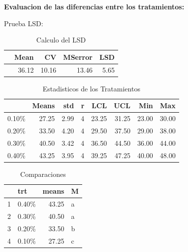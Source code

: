 \documentclass[12pt,letterpaper]{report}
\begin{document}
\textbf{Evaluacion de las diferencias entre los tratamientos:}

Prueba LSD:
\begin{Schunk}
\end{Schunk}

\begin{table}[ht]
\centering
\begin{tabular}{rrrrr}
  \hline
 & Mean & CV & MSerror & LSD \\ 
  \hline
  & 36.12 & 10.16 & 13.46 & 5.65 \\ 
   \hline
\end{tabular}
\caption{Calculo del LSD}
\end{table}

\begin{table}[ht]
\centering
\begin{tabular}{rrrrrrrr}
  \hline
      & Means & std & r & LCL & UCL & Min & Max \\ 
  \hline
0.10\% & 27.25 & 2.99 &   4 & 23.25 & 31.25 & 23.00 & 30.00 \\ 
  0.20\% & 33.50 & 4.20 &   4 & 29.50 & 37.50 & 29.00 & 38.00 \\ 
  0.30\% & 40.50 & 3.42 &   4 & 36.50 & 44.50 & 36.00 & 44.00 \\ 
  0.40\% & 43.25 & 3.95 &   4 & 39.25 & 47.25 & 40.00 & 48.00 \\ 
   \hline
\end{tabular}
\caption{Estadisticos de los Tratamientos}
\end{table}

\begin{table}[ht]
\centering
\begin{tabular}{rlrl}
  \hline
 & trt & means & M \\ 
  \hline
  1 & 0.40\% & 43.25 & a \\ 
  2 & 0.30\% & 40.50 & a \\ 
  3 & 0.20\% & 33.50 & b \\ 
  4 & 0.10\% & 27.25 & c \\ 
   \hline
\end{tabular}
\caption{Comparaciones}
\end{table}
\end{document}
